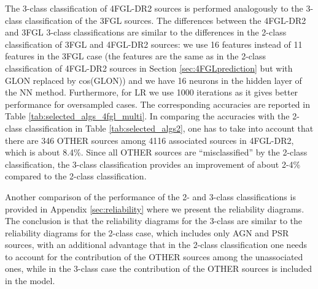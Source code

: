 The 3-class classification of 4FGL-DR2 sources is performed analogously to the 3-class classification of the 3FGL sources.
The differences between the 4FGL-DR2 and 3FGL 3-class classifications are similar to the differences in the 2-class classification of 3FGL and 4FGL-DR2 sources:
we use 16 features instead of 11 features in the 3FGL case (the features are the same as in the 2-class classification of 4FGL-DR2 sources in Section \ref{sec:4FGLprediction} but with GLON replaced by cos(GLON))
and we have 16 neurons in the hidden layer of the NN method. Furthermore, for LR we use 1000 iterations as it gives better performance for oversampled cases.
The corresponding accuracies are reported in Table \ref{tab:selected_algs_4fgl_multi}.
In comparing the accuracies with the 2-class classification in Table \ref{tab:selected_algs2}, 
one has to take into account that there are 346 OTHER sources among 4116 associated sources in 4FGL-DR2, which is about 8.4\%.
Since all OTHER sources are ``misclassified'' by the 2-class classification, the 3-class classification provides an improvement of about 2-4\% compared to the 2-class classification.

Another comparison of the performance of the 2- and 3-class classifications is provided in Appendix \ref{sec:reliability} where we present the reliability diagrams.
The conclusion is that the reliability diagrams for the 3-class are similar to the reliability diagrams for the 2-class case, which includes only AGN and PSR sources, with an additional advantage that in the 2-class classification one needs to account for the contribution of the OTHER sources among the unassociated ones, while in the 3-class case the contribution of the OTHER sources is included in the model.

